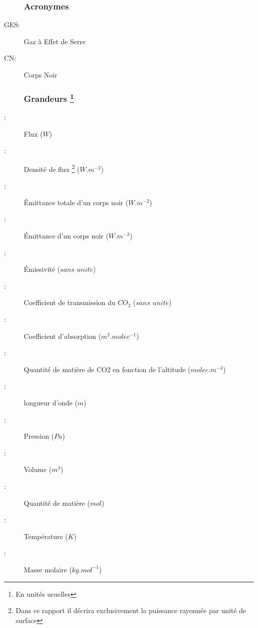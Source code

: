 \documentclass[a4paper, 12pt]{report} %
\begin{document}
\begin{description}
	\subsubsection*{Acronymes}
	\item[GES:] Gaz à Effet de Serre
    \item[CN:] Corps Noir
    
	\subsubsection*{Grandeurs \footnote{En unités usuelles}}
    \item[\boldmath{$\Phi$}:] Flux  ($W$)
    \item[\boldmath{$\phi$}:] Densité de flux \footnote{Dans ce rapport il décrira exclusivement la puissance rayonnée par unité de surface} ($W.m^{-2}$)
    \item[\boldmath{$M^{0}$}:] Émittance totale d'un corps noir ($W.m^{-2}$)
    \item[\boldmath{$M^{0}_{\lambda,T}$}:] Émittance d'un corps noir ($W.m^{-3}$)
    \item[\boldmath{$\epsilon$}:] Émissivité ($sans$ $unit\acute e$)
    \item[\boldmath{$\tau_{CO_2}$}:] Coefficient de transmission du $CO_2$ ($sans$ $unit\acute e$)
	\item[\boldmath{$k_{abs}$}:] Coefficient d'absorption ($m^2.molec^{-1}$)
    \item[\boldmath{$n_{CO2}(z)$}:] Quantité de matière de CO2 en fonction de l'altitude ($molec.m^{-3}$)
    \item[\boldmath{$\lambda$}:] longueur d'onde ($m$)
    \item[\boldmath{$P$}:] Pression ($Pa$)
    \item[\boldmath{$V$}:] Volume ($m^3$)
	\item[\boldmath{$n$}:] Quantité de matière ($mol$)
	\item[\boldmath{$T$}:] Température ($K$)
 	\item[\boldmath{$M$}:] Masse molaire ($kg.mol^{-1}$)
	

\end{description}
\end{document}

